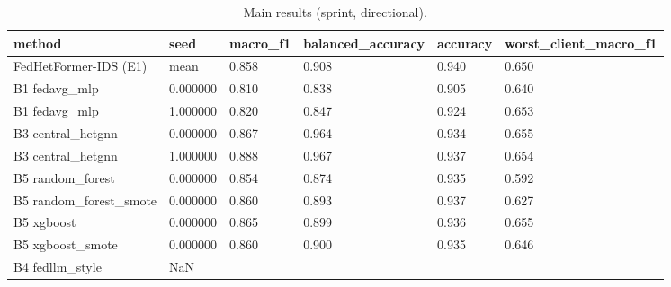 \begin{table}[htbp]
\centering
\caption{Main results (sprint, directional).}
\label{Tab_R_Main}
\footnotesize
\begin{tabular}{llllll}
\toprule
method & seed & macro\_f1 & balanced\_accuracy & accuracy & worst\_client\_macro\_f1 \\
\midrule
FedHetFormer-IDS (E1) & mean & 0.858 & 0.908 & 0.940 & 0.650 \\
B1 fedavg\_mlp & 0.000000 & 0.810 & 0.838 & 0.905 & 0.640 \\
B1 fedavg\_mlp & 1.000000 & 0.820 & 0.847 & 0.924 & 0.653 \\
B3 central\_hetgnn & 0.000000 & 0.867 & 0.964 & 0.934 & 0.655 \\
B3 central\_hetgnn & 1.000000 & 0.888 & 0.967 & 0.937 & 0.654 \\
B5 random\_forest & 0.000000 & 0.854 & 0.874 & 0.935 & 0.592 \\
B5 random\_forest\_smote & 0.000000 & 0.860 & 0.893 & 0.937 & 0.627 \\
B5 xgboost & 0.000000 & 0.865 & 0.899 & 0.936 & 0.655 \\
B5 xgboost\_smote & 0.000000 & 0.860 & 0.900 & 0.935 & 0.646 \\
B4 fedllm\_style & NaN &  &  &  &  \\
\bottomrule
\end{tabular}
\end{table}
